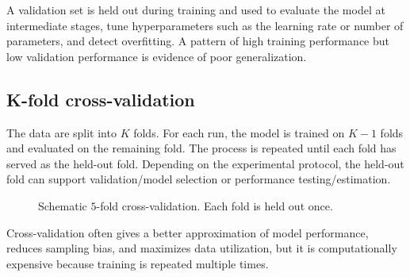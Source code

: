 \documentclass[11pt,a4paper]{report}
\begin{document}
A validation set is held out during training and used to evaluate the model at intermediate stages, tune hyperparameters such as the learning rate or number of parameters, and detect overfitting. A pattern of high training performance but low validation performance is evidence of poor generalization.

\subsection{K-fold cross-validation}

The data are split into $K$ folds. For each run, the model is trained on $K-1$ folds and evaluated on the remaining fold. The process is repeated until each fold has served as the held-out fold. Depending on the experimental protocol, the held-out fold can support validation/model selection or performance testing/estimation.

\begingroup
\setlength{\intextsep}{8pt}
\captionsetup{skip=4pt}
\begin{figure}[H]
\centering
{}
\caption{Schematic $5$-fold cross-validation. Each fold is held out once.}
\label{fig:kfold}
\end{figure}
\endgroup

Cross-validation often gives a better approximation of model performance, reduces sampling bias, and maximizes data utilization, but it is computationally expensive because training is repeated multiple times.
\end{document}
